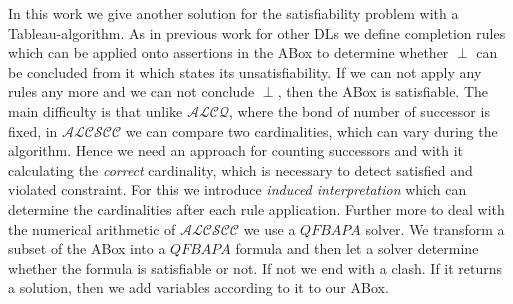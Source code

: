 \documentclass[a4paper,11pt]{scrartcl}
\theoremstyle{break}
\theoremstyle{definition}
\begin{document}
In this work we give another solution for the satisfiability problem with a Tableau-algorithm. As in previous work for other DLs we define completion rules which can be applied onto assertions in the ABox to determine whether $\perp$ can be concluded from it which states its unsatisfiability. If we can not apply any rules any more and we can not conclude $\perp$, then the ABox is satisfiable. The main difficulty is that unlike $\mathcal{ALCQ}$, where the bond of number of successor is fixed, in $\mathcal{ALCSCC}$ we can compare two cardinalities, which can vary during the algorithm. Hence we need an approach for counting successors and with it calculating the \textit{correct} cardinality, which is necessary to detect satisfied and violated constraint. For this we introduce \textit{induced interpretation} which can determine the cardinalities after each rule application. Further more to deal with the numerical arithmetic of $\mathcal{ALCSCC}$ we use a $QFBAPA$ solver. We transform a subset of the ABox into a $QFBAPA$ formula and then let a solver determine whether the formula is satisfiable or not. If not we end with a clash. If it returns a solution, then we add variables according to it to our ABox.
\end{document}
